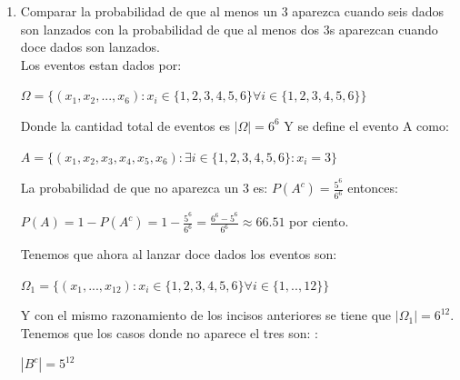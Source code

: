 \documentclass[12pt,a4paper]{report}
\begin{document}
\begin{enumerate}
{\begin{enumerate}[label=\alph*) ]
{Al tirar dos dados hay así $6^2$ posibilidades y al ser 24 tiros son $(6^2)^{24}$ posibilidades. La probabilidad de que no se obtenga ningun doble cinco esta dada por:\\
\begin{center}
$P(B^c)= \frac{(5^2)^{24}}{(6^2)^{24}}=(\frac{25}{36})^{24}$
\end{center}
Entonces la probabilidad de que salga al menos un doble 5 es:\\
\begin{center}
$1-(\frac{25}{36})^{24}=\frac{1}{1}-\frac{5^{48}}{6^{48}}=\frac{6^{48}-5^{48}}{6^{48}}\approx 99.98$ por ciento.
\end{center}
    }
    \item{Comparar la probabilidad de que al menos un 3 aparezca cuando seis dados son lanzados con la probabilidad de que al menos dos 3s aparezcan cuando doce dados son lanzados.\\
    Los eventos estan dados por: \\
    \begin{center}
    $\Omega = \lbrace (x_{1},x_{2},...,x_{6}): x_{i}\in \lbrace 1,2,3,4,5,6\rbrace \forall i\in \lbrace 1,2,3,4,5,6 \rbrace \rbrace$
    \end{center}
    Donde la cantidad total de eventos es $|\Omega|=6^6$
    Y se define el evento A como:\\
    \begin{center}
    $A = \lbrace (x_{1},x_{2},x_{3},x_{4},x_{5},x_{6}):\exists i\in \lbrace 1,2,3,4,5,6 \rbrace : x_{i}=3 \rbrace$
    \end{center}
    La probabilidad de que no aparezca un 3 es: $P(A^c)= \frac{5^6}{6^6}$ entonces: \\
    \begin{center}
    $P(A)=1-P(A^c)=1-\frac{5^6}{6^6}=\frac{6^6-5^6}{6^6}\approx 66.51 $ por ciento.
    \end{center}
    Tenemos que ahora al lanzar doce dados los eventos son:\\
    \begin{center}
    $\Omega_{1}= \lbrace (x_{1},...,x_{12}): x_{i}\in \lbrace 1,2,3,4,5,6 \rbrace \forall i \in \lbrace 1,..,12 \rbrace \rbrace$
    \end{center}
    Y con el mismo razonamiento de los incisos anteriores se tiene que $|\Omega_{1}|=6^{12}$. Tenemos que los casos donde no aparece el tres son: :\\
    \begin{center}
    $|B^c|= 5^{12}$

\end{center}}
\end{enumerate}}
\end{enumerate}
\end{document}
